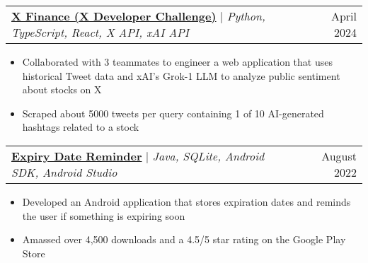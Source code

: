 \documentclass[letterpaper,11pt]{article}
\makeatletter
\newcommand{\resumeItem}[1]{
  \item\small{
    {#1 \vspace{-2pt}}
  }
}
\newcommand{\resumeProjectHeading}[2]{
    \item
    \begin{tabular*}{0.97\textwidth}{l@{\extracolsep{\fill}}r}
      \small#1 & #2 \\
    \end{tabular*}\vspace{-7pt}
}
\newcommand{\resumeItemListStart}{\begin{itemize}}
\newcommand{\resumeItemListEnd}{\end{itemize}\vspace{-5pt}}
\makeatother
\begin{document}

  \resumeProjectHeading
    {\href{https://github.com/anish-sahoo/XDevChallenge}{\textbf{X Finance (X Developer Challenge)}} $|$ \emph{Python, TypeScript, React, X API, xAI API}}{April 2024}
    \resumeItemListStart
      \resumeItem{Collaborated with 3 teammates to engineer a web application that uses historical Tweet data and xAI's Grok-1 LLM to analyze public sentiment about stocks on X}
      \resumeItem{Scraped about 5000 tweets per query containing 1 of 10 AI-generated hashtags related to a stock}
    \resumeItemListEnd

    


  \resumeProjectHeading
    {\href{https://play.google.com/store/apps/details?id=com.anish.expirydatereminder}{\textbf{Expiry Date Reminder}} $|$ \emph{Java, SQLite, Android SDK, Android Studio}}{August 2022}
    \resumeItemListStart
      \resumeItem{Developed an Android application that stores expiration dates and reminds the user if something is expiring soon}
      \resumeItem{Amassed over 4,500 downloads and a 4.5/5 star rating on the Google Play Store}
    \resumeItemListEnd
\end{document}
